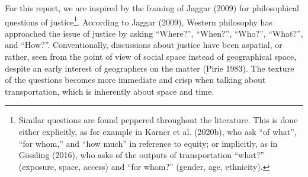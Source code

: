 \documentclass[12pt, oneside]{report}
\begin{document}
For this report, we are inspired by the framing of Jaggar (2009) for
philosophical questions of justice\footnote{Similar questions are found
  peppered throughout the literature. This is done either explicitly, as
  for example in Karner et al. (2020b), who ask ``of what'', ``for
  whom,'' and ``how much'' in reference to equity; or implicitly, as in
  Gössling (2016), who asks of the outputs of transportation ``what?''
  (exposure, space, access) and ``for whom?'' (gender, age, ethnicity).}.
According to Jaggar (2009), Western philosophy has approached the issue
of justice by asking ``Where?'', ``When?'', ``Who?'', ``What?'', and
``How?''. Conventionally, discussions about justice have been aspatial,
or rather, seen from the point of view of social space instead of
geographical space, despite an early interest of geographers on the
matter (Pirie 1983). The texture of the questions becomes more immediate
and crisp when talking about transportation, which is inherently about
space and time.
\end{document}
